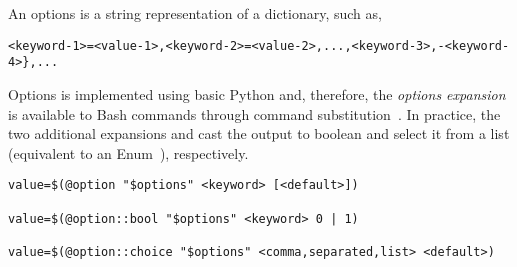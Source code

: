 
An options is a string representation of a dictionary, such as,
%
\begin{verbatim}
<keyword-1>=<value-1>,<keyword-2>=<value-2>,...,<keyword-3>,-<keyword-4>},...
\end{verbatim}
%
Options is implemented using basic Python and, therefore, the \emph{options expansion} is available to Bash commands through command substitution~\cite{command_substitution}. In practice, the two additional expansions  and  cast the output to boolean and select it from a list (equivalent to an Enum~\cite{python_eunum}), respectively.
%
\begin{verbatim}
value=$(@option "$options" <keyword> [<default>])

value=$(@option::bool "$options" <keyword> 0 | 1)

value=$(@option::choice "$options" <comma,separated,list> <default>)
\end{verbatim}
